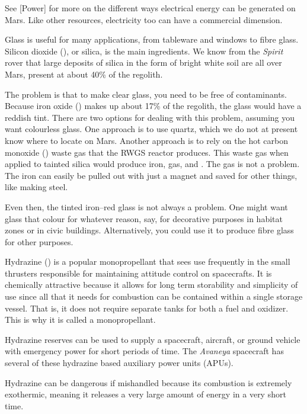 See [Power] for more on the different ways electrical energy can be generated on Mars. Like other resources, electricity too can have a commercial dimension.

Glass is useful for many applications, from tableware and windows to fibre glass. Silicon dioxide (), or silica, is the main ingredients. We know from the {\it Spirit} rover that large deposits of silica in the form of bright white soil are all over Mars, present at about 40\% of the regolith. 

The problem is that to make clear glass, you need to be free of contaminants. Because iron oxide () makes up about 17\% of the regolith, the glass would have a reddish tint. There are two options for dealing with this problem, assuming you want colourless glass. One approach is to use quartz, which we do not at present know where to locate on Mars. Another approach is to rely on the hot carbon monoxide () waste gas that the RWGS reactor produces. This waste gas when applied to tainted silica would produce iron,  gas, and . The gas is not a problem. The iron can easily be pulled out with just a magnet and saved for other things, like making steel.

Even then, the tinted iron--red glass is not always a problem. One might want glass that colour for whatever reason, say, for decorative purposes in habitat zones or in civic buildings. Alternatively, you could use it to produce fibre glass for other purposes.

Hydrazine () is a popular monopropellant that sees use frequently in the small thrusters responsible for maintaining attitude control on spacecrafts. It is chemically attractive because it allows for long term storability and simplicity of use since all that it needs for combustion can be contained within a single storage vessel. That is, it does not require separate tanks for both a fuel and oxidizer. This is why it is called a monopropellant.

Hydrazine reserves can be used to supply a spacecraft, aircraft, or ground vehicle with emergency power for short periods of time. The {\it Avaneya} spacecraft has several of these hydrazine based auxiliary power units (APUs).

Hydrazine can be dangerous if mishandled because its combustion is extremely exothermic, meaning it releases a very large amount of energy in a very short time.


